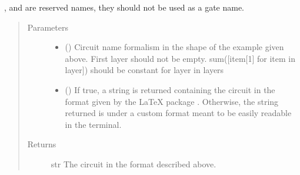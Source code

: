\documentclass[letterpaper,10pt,english]{sphinxmanual}
\begin{document}
\begin{fulllineitems}
\begin{description}
\end{description}

,  and  are reserved names, 
they should not be used as a gate name.
\begin{quote}\begin{description}
\item[{Parameters}] \leavevmode\begin{itemize}
\item {} 
 (\sphinxstyleliteralemphasis{\sphinxupquote{{[}}}\sphinxstyleliteralemphasis{\sphinxupquote{{[}}}\sphinxstyleliteralemphasis{\sphinxupquote{(}}\sphinxstyleliteralemphasis{\sphinxupquote{,}}\sphinxstyleliteralemphasis{\sphinxupquote{)}}\sphinxstyleliteralemphasis{\sphinxupquote{{]}}}\sphinxstyleliteralemphasis{\sphinxupquote{{]}}}) \textendash{} Circuit name formalism in the shape 
of the example given above. 
First layer should not be empty.
sum({[}item{[}1{]} for item in layer{]}) should be constant for layer in layers

\item {} 
 () \textendash{} If true, a string is returned containing the circuit in
the format given by the LaTeX package . Otherwise, the string
returned is under a custom format meant to be easily readable in the 
terminal.

\end{itemize}

\item[{Returns}] \leavevmode
str \textendash{} The circuit in the format described above.

\end{description}\end{quote}

\end{fulllineitems}
\end{document}
